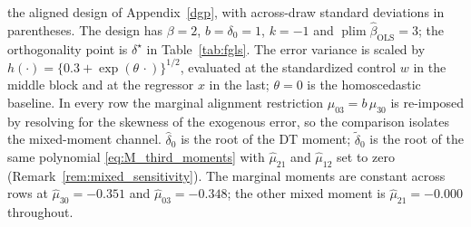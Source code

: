 \begin{table}[!h]
\begin{threeparttable}
\begin{tablenotes}
the aligned design of Appendix~\ref{dgp}, with across-draw standard deviations
in parentheses. The design has \(\beta=2\), \(b=\delta_0=1\), \(k=-1\) and
\(\operatorname{plim}\widehat\beta_{\mathrm{OLS}}=3\); the orthogonality point is
\(\delta^\star\) in Table~\ref{tab:fgls}. The error variance is scaled by
\(h(\cdot)=\{0.3+\exp(\theta\,\cdot)\}^{1/2}\), evaluated at the standardized
control \(w\) in the middle block and at the regressor \(x\) in the last;
\(\theta=0\) is the homoscedastic baseline. In every row the marginal alignment
restriction \(\mu_{03}=b\,\mu_{30}\) is re-imposed by resolving for the skewness
of the exogenous error, so the comparison isolates the mixed-moment channel.
\(\widehat\delta_0\) is the root of the DT moment; \(\widetilde\delta_0\) is the
root of the same polynomial \eqref{eq:M_third_moments} with \(\widehat\mu_{21}\)
and \(\widehat\mu_{12}\) set to zero (Remark~\ref{rem:mixed_sensitivity}). The
marginal moments are constant across rows at \(\widehat\mu_{30}=-0.351\) and
\(\widehat\mu_{03}=-0.348\); the other mixed moment is \(\widehat\mu_{21}=-0.000\)
throughout.
\end{tablenotes}
\end{threeparttable}
\end{table}
